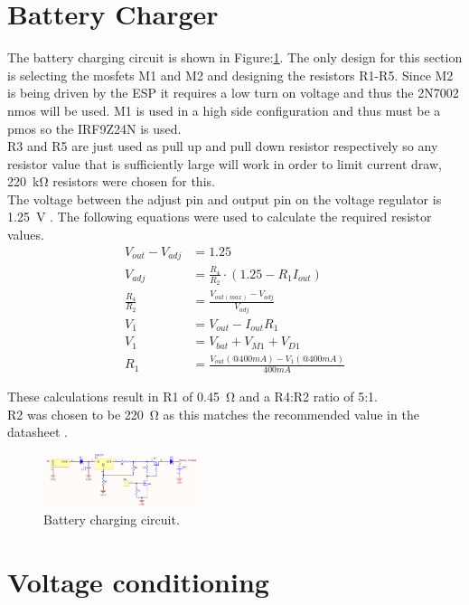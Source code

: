 \clearpage
\section{Battery Charger}

The battery charging circuit is shown in Figure:\ref{fig:bat_charg}. The only design for this section is selecting the mosfets M1 and M2 and designing the resistors R1-R5. Since M2 is being driven by the ESP it requires a low turn on voltage and thus the 2N7002 nmos will be used. M1 is used in a high side configuration and thus must be a pmos so the IRF9Z24N is used.\\

R3 and R5 are just used as pull up and pull down resistor respectively so any resistor value that is sufficiently large will work in order to limit current draw, \SI{220}{\kilo\ohm} resistors were chosen for this.\\

The voltage between the adjust pin and output pin on the voltage regulator is \SI{1.25}{\volt} \cite{LM317}. The following equations were used to calculate the required resistor values.
\begin{align*}
V_{out}-V_{adj}&=1.25\\
V_{adj}&=\frac{R_4}{R_2} \cdot \left(1.25-R_1 I_{out} \right)\\
\frac{R_4}{R_2} &= \frac{V_{out(max)}-V_{adj}}{V_{adj}}\\
V_1 &=V_{out}-I_{out}R_1\\
V_1 &=V_{bat}+V_{M1}+V_{D1}\\
R_1 &=\frac{V_{out}(@400mA)- V_1(@400mA)}{400mA}
\end{align*} 

These calculations result in R1 of \SI{0.45}{\ohm} and a R4:R2 ratio of 5:1.\\
R2 was chosen to be \SI{220}{\ohm} as this matches the recommended value in the datasheet \cite{LM317}.
 
\begin{figure}[H]
\centering
\includegraphics[width = 0.4\textwidth]{./Figures/Bat_Charg.png}
\caption{Battery charging circuit.}
\label{fig:bat_charg}
\end{figure}

\clearpage
\section{Voltage conditioning}

